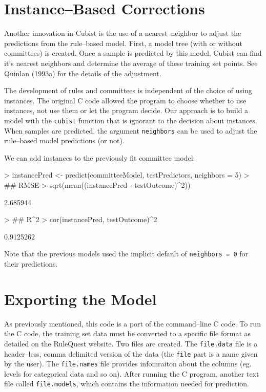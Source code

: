 \documentclass[12pt]{article}
\newcommand{\code}[1]{\mbox{\footnotesize\color{darkblue}\texttt{#1}}}
\newcommand{\pkg}[1]{{\fontseries{b}\selectfont #1}}
\renewcommand{\pkg}[1]{{\textsf{#1}}}
\renewenvironment{Schunk}{\vspace{\topsep}}{\vspace{\topsep}}
\begin{document}
\section{Instance--Based Corrections}

Another innovation in Cubist is the use of a nearest--neighbor to adjust the predictions from the rule--based model. First, a model tree (with or without committees) is created. Once a sample is predicted by this model, Cubist can find it's nearest neighbors and determine the average of these training set points. See Quinlan (1993a) for the details of the adjustment.

The development of rules and committees is independent of the choice of using instances. The original \pkg{C} code allowed the program to choose whether to use instances, not use them or let the program decide. Our approach is to build a model with the \code{cubist} function that is ignorant to the decision about instances. When samples are predicted, the argument \code{neighbors} can be used to adjust the rule--based model predictions (or not). 

We can add instances to the previously fit committee model:
\begin{Schunk}
\begin{Sinput}
> instancePred <- predict(committeeModel, testPredictors, neighbors = 5)
> ## RMSE
> sqrt(mean((instancePred - testOutcome)^2))
\end{Sinput}
\begin{Soutput}
[1] 2.685944
\end{Soutput}
\begin{Sinput}
> ## R^2
> cor(instancePred, testOutcome)^2
\end{Sinput}
\begin{Soutput}
[1] 0.9125262
\end{Soutput}
\end{Schunk}
Note that the previous models used the implicit default of \code{neighbors = 0} for their predictions.


\section{Exporting the Model}

As previously mentioned, this code is a port of the command--line \pkg{C} code. To run the \pkg{C} code, the training set data must be converted to a specific file format as detailed on the RuleQuest website. Two files are created. The \texttt{file.data} file is a header--less, comma delimited version of the data (the \texttt{file} part is a name given by the user). The \texttt{file.names} file provides infomraiton about the columns (eg. levels for categorical data and so on). After running the \pkg{C} program, another text file called \texttt{file.models}, which contains the information needed for prediction. 
\end{document}
